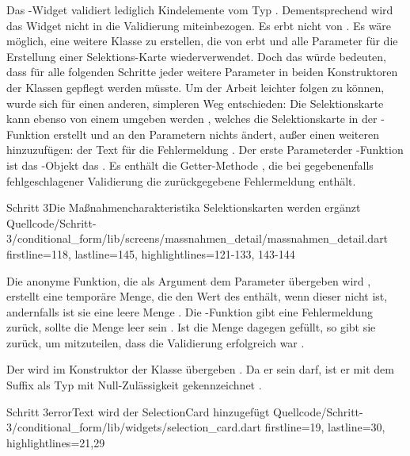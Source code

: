  
Das -Widget validiert lediglich Kindelemente vom Typ .
Dementsprechend wird das Widget  nicht in die Validierung miteinbezogen.
Es erbt nicht von .
Es wäre möglich, eine weitere Klasse zu erstellen, die von  erbt und alle Parameter für die Erstellung einer Selektions-Karte wiederverwendet.
Doch das würde bedeuten, dass für alle folgenden Schritte jeder weitere Parameter in beiden Konstruktoren der Klassen gepflegt werden müsste.
Um der Arbeit leichter folgen zu können, wurde sich für einen anderen, simpleren Weg entschieden: 
Die Selektionskarte kann ebenso von einem  umgeben werden , welches die Selektionskarte in der -Funktion erstellt und an den Parametern nichts ändert, außer einen weiteren hinzuzufügen: der Text für die Fehlermeldung .
Der erste Parameterder -Funktion ist das -Objekt das .
Es enthält die Getter-Methode , die bei gegebenenfalls fehlgeschlagener Validierung die zurückgegebene Fehlermeldung enthält.

\begin{alexlisting}{Schritt 3}{Die Maßnahmencharakteristika Selektionskarten werden ergänzt}
    {Quellcode/Schritt-3/conditional_form/lib/screens/massnahmen_detail/massnahmen_detail.dart}
    {firstline=118, lastline=145, highlightlines={121-133, 143-144}}
    \label{lst:Schritt3buildSelectionCardValidator}
\end{alexlisting}

Die anonyme Funktion, die als Argument dem Parameter  übergeben wird , erstellt eine temporäre Menge, die den Wert des  enthält, wenn dieser nicht  ist, andernfalls ist sie eine leere Menge .
Die -Funktion gibt eine Fehlermeldung zurück, sollte die Menge leer sein .
Ist die Menge dagegen gefüllt, so gibt sie  zurück, um mitzuteilen, dass die Validierung erfolgreich war .



Der  wird im Konstruktor der Klasse  übergeben .
Da er  sein darf, ist er mit dem Suffix  als Typ mit Null-Zulässigkeit gekennzeichnet .

\begin{alexlisting}{Schritt 3}{errorText wird der SelectionCard hinzugefügt}
    {Quellcode/Schritt-3/conditional_form/lib/widgets/selection_card.dart}
    {firstline=19, lastline=30, highlightlines={21,29}}
    \label{lst:Schritt3errorText}
\end{alexlisting}

